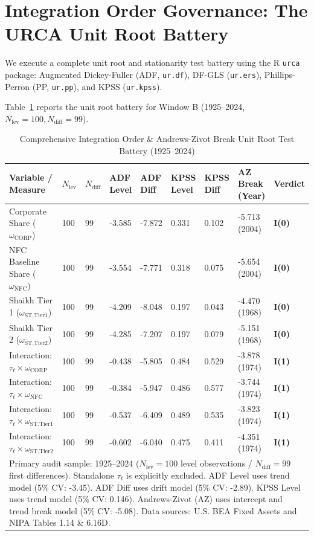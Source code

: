 \documentclass[11pt,a4paper]{article}
\begin{document}
\FloatBarrier
\section{Integration Order Governance: The URCA Unit Root Battery}

We execute a complete unit root and stationarity test battery using the R \texttt{urca} package: Augmented Dickey-Fuller (ADF, \texttt{ur.df}), DF-GLS (\texttt{ur.ers}), Phillips-Perron (PP, \texttt{ur.pp}), and KPSS (\texttt{ur.kpss}).

Table~\ref{tab:urca_results} reports the unit root battery for Window B (1925--2024, $N_{\text{lev}} = 100, N_{\text{diff}} = 99$).

\begin{table}[h!]
\centering
\small
\caption{Comprehensive Integration Order \& Andrews-Zivot Break Unit Root Test Battery (1925--2024)}
\label{tab:urca_results}
\begin{tabular}{p{3.8cm} p{0.8cm} p{0.8cm} p{1.3cm} p{1.3cm} p{1.3cm} p{1.3cm} p{1.8cm} p{1.5cm}}
\toprule
\textbf{Variable / Measure} & \textbf{$N_{\text{lev}}$} & \textbf{$N_{\text{diff}}$} & \textbf{ADF Level} & \textbf{ADF Diff} & \textbf{KPSS Level} & \textbf{KPSS Diff} & \textbf{AZ Break (Year)} & \textbf{Verdict} \\
\midrule
Corporate Share ($\omega_{\text{CORP}}$) & 100 & 99 & -3.585 & -7.872 & 0.331 & 0.102 & -5.713 (2004) & \textbf{I(0)} \\
NFC Baseline Share ($\omega_{\text{NFC}}$) & 100 & 99 & -3.554 & -7.771 & 0.318 & 0.075 & -5.654 (2004) & \textbf{I(0)} \\
Shaikh Tier 1 ($\omega_{\text{ST,Tier1}}$) & 100 & 99 & -4.209 & -8.048 & 0.197 & 0.043 & -4.470 (1968) & \textbf{I(0)} \\
Shaikh Tier 2 ($\omega_{\text{ST,Tier2}}$) & 100 & 99 & -4.285 & -7.207 & 0.197 & 0.079 & -5.151 (1968) & \textbf{I(0)} \\
Interaction: $\tau_t \times \omega_{\text{CORP}}$ & 100 & 99 & -0.438 & -5.805 & 0.484 & 0.529 & -3.878 (1974) & \textbf{I(1)} \\
Interaction: $\tau_t \times \omega_{\text{NFC}}$ & 100 & 99 & -0.384 & -5.947 & 0.486 & 0.577 & -3.744 (1974) & \textbf{I(1)} \\
Interaction: $\tau_t \times \omega_{\text{ST,Tier1}}$ & 100 & 99 & -0.537 & -6.409 & 0.489 & 0.535 & -3.823 (1974) & \textbf{I(1)} \\
Interaction: $\tau_t \times \omega_{\text{ST,Tier2}}$ & 100 & 99 & -0.602 & -6.040 & 0.475 & 0.411 & -4.351 (1974) & \textbf{I(1)} \\
\bottomrule
\multicolumn{9}{p{16.0cm}}{\footnotesize Primary audit sample: 1925--2024 ($N_{\text{lev}}=100$ level observations / $N_{\text{diff}}=99$ first differences). Standalone $\tau_t$ is explicitly excluded. ADF Level uses trend model (5\% CV: -3.45). ADF Diff uses drift model (5\% CV: -2.89). KPSS Level uses trend model (5\% CV: 0.146). Andrews-Zivot (AZ) uses intercept and trend break model (5\% CV: -5.08). Data sources: U.S. BEA Fixed Assets and NIPA Tables 1.14 \& 6.16D.}
\end{tabular}
\end{table}
\end{document}
